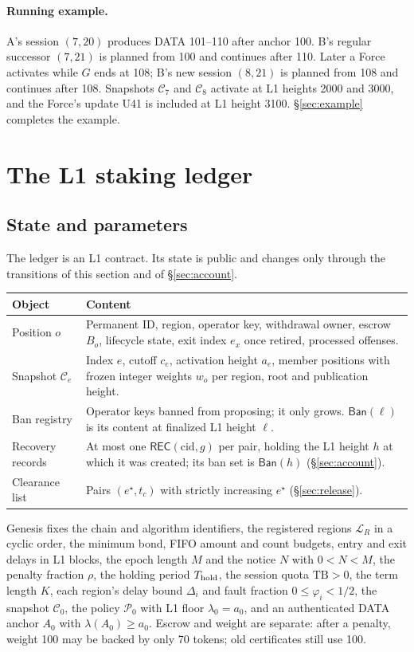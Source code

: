 \documentclass[11pt,a4paper]{article}
\newcommand{\tagg}[1]{\mathsf{#1}}
\newcommand{\cfg}{\mathcal C}
\newcommand{\Ban}{\mathsf{Ban}}
\newcommand{\cid}{\mathrm{cid}}
\begin{document}
\paragraph{Running example.}
A's session $(7,20)$ produces DATA 101--110 after anchor 100. B's regular
successor $(7,21)$ is planned from 100 and continues after 110. Later a
Force activates while $G$ ends at 108; B's new session $(8,21)$ is planned
from 108 and continues after 108. Snapshots $\cfg_7$ and $\cfg_8$ activate
at L1 heights 2000 and 3000, and the Force's update U41 is included at
L1 height 3100. \S\ref{sec:example} completes the example.

\section{The L1 staking ledger}
\label{sec:ledger}
\subsection{State and parameters}
The ledger is an L1 contract. Its state is public and changes only
through the transitions of this section and of \S\ref{sec:account}.

\begin{tabularx}{\linewidth}{@{}>{\raggedright\arraybackslash}p{.20\linewidth}Y@{}}\toprule
Object & Content\\\midrule
Position $o$ & Permanent ID, region, operator key, withdrawal owner,
escrow $B_o$, lifecycle state, exit index $e_x$ once retired, processed
offenses.\\
Snapshot $\cfg_e$ & Index $e$, cutoff $c_e$, activation height $a_e$,
member positions with frozen integer weights $w_o$ per region, root and
publication height.\\
Ban registry & Operator keys banned from proposing; it only grows.
$\Ban(\ell)$ is its content at finalized L1 height $\ell$.\\
Recovery records & At most one $\tagg{REC}(\cid,g)$ per pair, holding the
L1 height $h$ at which it was created; its ban set is $\Ban(h)$
(\S\ref{sec:account}).\\
Clearance list & Pairs $(e^\star,t_c)$ with strictly increasing
$e^\star$ (\S\ref{sec:release}).\\\bottomrule
\end{tabularx}

Genesis fixes the chain and algorithm identifiers, the registered regions
$\mathcal L_R$ in a cyclic order, the minimum bond, FIFO amount and count
budgets, entry and exit delays in L1 blocks, the epoch length $M$ and
the notice $N$ with $0<N<M$, the penalty fraction $\rho$, the holding
period $T_{\rm hold}$, the session quota $\mathrm{TB}>0$, the term length
$K$, each region's delay bound $\Delta_i$ and fault fraction
$0\le\varphi_i<1/2$, the snapshot $\cfg_0$, the policy $\mathcal P_0$ with
L1 floor $\lambda_0=a_0$, and an authenticated DATA anchor $A_0$ with
$\lambda(A_0)\ge a_0$. Escrow and weight are separate: after a penalty,
weight 100 may be backed by only 70 tokens; old certificates still use
100.
\end{document}
